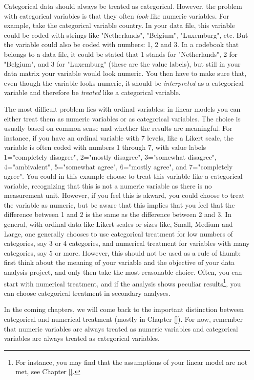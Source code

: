 \documentclass[]{report}\usepackage[]{graphicx}\usepackage[]{color}
\begin{document}
Categorical data should always be treated as categorical. However, the problem with categorical variables is that they often \textit{look} like numeric variables. For example, take the categorical variable country. In your data file, this variable could be coded with strings like "Netherlands", "Belgium", "Luxemburg", etc. But the variable could also be coded with numbers: 1, 2 and 3. In a codebook that belongs to a data file, it could be stated that 1 stands for "Netherlands", 2 for "Belgium", and 3 for "Luxemburg" (these are the value labels), but still in your data matrix your variable would look numeric. You then have to make sure that, even though the variable looks numeric, it should be \textit{interpreted} as a categorical variable and therefore be \textit{treated} like a categorical variable.

The most difficult problem lies with ordinal variables: in linear models you can either treat them as numeric variables or as categorical variables. The choice is usually based on common sense and whether the results are meaningful. For instance, if you have an ordinal variable with 7 levels, like a Likert scale, the variable is often coded with numbers 1 through 7, with value labels 1="completely disagree", 2="mostly disagree", 3="somewhat disagree", 4="ambivalent", 5="somewhat agree", 6="mostly agree", and 7="completely agree". You could in this example choose to treat this variable like a categorical variable, recognizing that this is not a numeric variable as there is no measurement unit. However, if you feel this is akward, you could choose to treat the variable as numeric, but be aware that this implies that you feel that the difference between 1 and 2 is the same as the difference between 2 and 3. In general, with ordinal data like Likert scales or sizes like, Small, Medium and Large, one generally chooses to use categorical treatment for low numbers of categories, say 3 or 4 categories, and numerical treatment for variables with many categories, say 5 or more. However, this should not be used as a rule of thumb: first think about the meaning of your variable and the objective of your data analysis project, and only then take the most reasonable choice. Often, you can start with numerical treatment, and if the analysis shows peculiar results\footnote{For instance, you may find that the assumptions of your linear model are not met, see Chapter \ref{}.}, you can choose categorical treatment in secondary analyses.

In the coming chapters, we will come back to the important distinction between categorical and numerical treatment (mostly in Chapter \ref{}). For now, remember that numeric variables are always treated as numeric variables and categorical variables are always treated as categorical variables.
\end{document}

